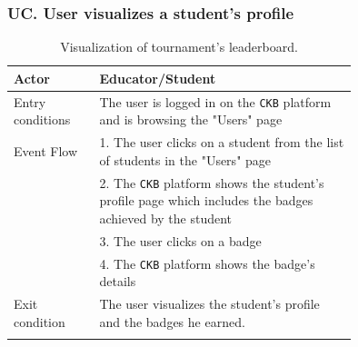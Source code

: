 \subsubsection*{UC\cuc . User visualizes a student's profile}
\begin{center}
    \begin{longtable}{lp{0.75\linewidth}}
        \hline
        Actor            & Educator/Student \\
        \hline
        Entry conditions & The user is logged in on the \verb|CKB| platform and is browsing the "Users" page\\
        \hline
        Event Flow      
        & 1. The user clicks on a student from the list of students in the "Users" page\\
        & 2. The \verb|CKB| platform shows the student's profile page which includes the badges achieved by the student\\
        & 3. The user clicks on a badge\\
        & 4. The \verb|CKB| platform shows the badge's details\\
        \hline
        Exit condition   & The user visualizes the student's profile and the badges he earned.   \\ 
        \hline
        \caption{Visualization of tournament's leaderboard.}
        \label{tab: view_profile_use_case}
    \end{longtable}

\end{center}



